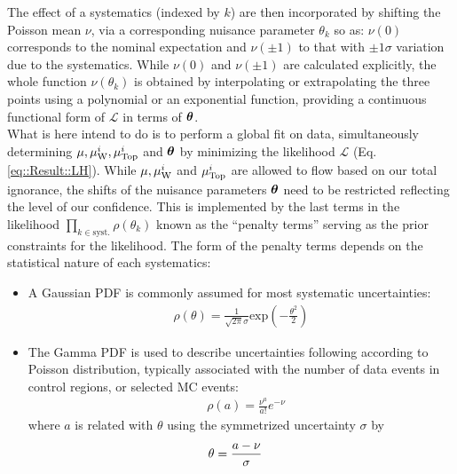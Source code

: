 The effect of a systematics (indexed by $k$) are then incorporated by shifting the Poisson mean $\nu$, via a corresponding nuisance parameter $\theta_k$ so as:
$\nu(0)$ corresponds to the nominal expectation and $\nu(\pm1)$ to that with $\pm 1\sigma$ variation due to the systematics. 
While $\nu(0)$ and $\nu(\pm1)$ are calculated explicitly, the whole function $\nu(\theta_k)$ is obtained by interpolating or extrapolating the three points using a polynomial or an exponential function, providing a continuous functional form of $\mathcal{L}$ in terms of $\bm{\theta}$. \\

What is here intend to do is to perform a global fit on data, simultaneously determining $\mu, \mu_{\mathrm{W}}^i, \mu_{\mathrm{Top}}^i$ and $\bm{\theta}$ by minimizing the likelihood $\mathcal{L}$ (Eq. \ref{eq::Result::LH}). While $\mu, \mu_{\mathrm{W}}^i$ and $\mu_{\mathrm{Top}}^i$ are allowed to flow based on our total ignorance, the shifts of the nuisance parameters $\bm{\theta}$ need to be restricted reflecting the level of our confidence. This is implemented by the last terms in the likelihood $\prod_{k \in \mathrm{syst.}} \rho(\theta_k)$ known as the ``penalty terms'' serving as the prior constraints for the likelihood. 
The form of the penalty terms depends on the statistical nature of each systematics:
\begin{itemize}
\item A Gaussian PDF is commonly assumed for most systematic uncertainties:
\begin{align}
\rho (\theta) = \frac{1}{\sqrt{2\pi}\sigma} \mathrm{exp} \left( - \frac{\theta^2}{2} \right)
\end{align}


\item The Gamma PDF is used to describe uncertainties following according to Poisson distribution, typically associated with the number of data events in control regions, or selected MC events:
\begin{align}
& \rho (a) = \frac{\nu^a}{a!} e^{-\nu} 
\end{align}
where $a$ is related with $\theta$ using the symmetrized uncertainty $\sigma$ by 
\begin{align}
& \theta = \frac{a-\nu}{\sigma} \nonumber 
\end{align}
\end{itemize}

